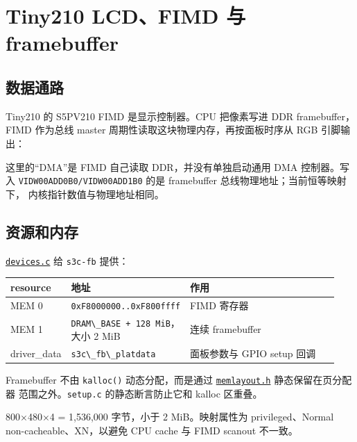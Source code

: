 \chapter{Tiny210 LCD、FIMD 与
framebuffer}\label{tiny210-lcdfimd-ux4e0e-framebuffer}

\section{数据通路}\label{ux6570ux636eux901aux8def}

Tiny210 的 S5PV210 FIMD 是显示控制器。CPU 把像素写进 DDR
framebuffer，FIMD 作为总线 master 周期性读取这块物理内存，再按面板时序从
RGB 引脚输出：



这里的``DMA''是 FIMD 自己读取 DDR，并没有单独启动通用 DMA 控制器。写入
\passthrough{\lstinline!VIDW00ADD0B0/VIDW00ADD1B0!} 的是 framebuffer
总线物理地址；当前恒等映射下， 内核指针数值与物理地址相同。

\section{资源和内存}\label{ux8d44ux6e90ux548cux5185ux5b58}

\href{../../../kernel/arch/arm/mach-s5pv210/devices.c}{\passthrough{\lstinline!devices.c!}}
给 \passthrough{\lstinline!s3c-fb!} 提供：

{\def\LTcaptype{none} %
\begin{longtable}[]{@{}p{0.18\linewidth}p{0.26\linewidth}p{0.50\linewidth}@{}}
\toprule\noalign{}
resource & 地址 & 作用 \\
\midrule\noalign{}
\endhead
\bottomrule\noalign{}
\endlastfoot
MEM 0 & \passthrough{\lstinline!0xF8000000..0xF800ffff!} & FIMD
寄存器 \\
MEM 1 & \passthrough{\lstinline!DRAM\_BASE + 128 MiB!}，大小 2 MiB &
连续 framebuffer \\
driver\_data & \passthrough{\lstinline!s3c\_fb\_platdata!} & 面板参数与
GPIO setup 回调 \\
\end{longtable}
}

Framebuffer 不由 \passthrough{\lstinline!kalloc()!} 动态分配，而是通过
\href{../../../kernel/arch/arm/mach-s5pv210/memlayout.h}{\passthrough{\lstinline!memlayout.h!}}
静态保留在页分配器 范围之外。\passthrough{\lstinline!setup.c!}
的静态断言防止它和 kalloc 区重叠。

800×480×4 = 1,536,000 字节，小于 2 MiB。映射属性为 privileged、Normal
non-cacheable、XN，以避免 CPU cache 与 FIMD scanout 不一致。

